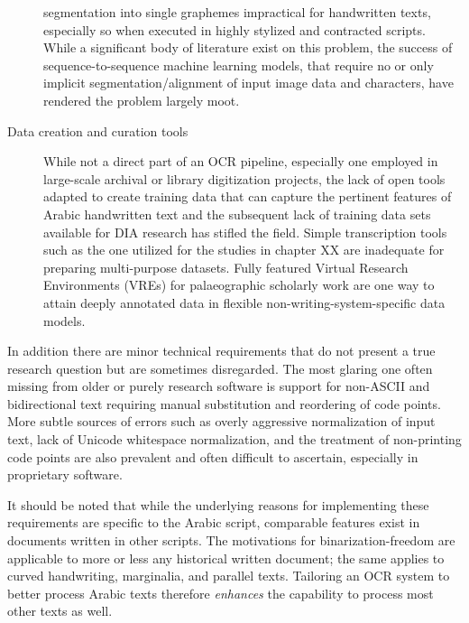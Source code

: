 \begin{description}
		segmentation into single graphemes impractical for handwritten
		texts, especially so when executed in highly stylized and
		contracted scripts. While a significant body of literature
		exist on this problem, the success of sequence-to-sequence
		machine learning models, that require no or only implicit
		segmentation/alignment of input image data and characters, have
		rendered the problem largely moot.
	\item[Data creation and curation tools] While not a direct part of an
		OCR pipeline, especially one employed in large-scale archival
		or library digitization projects, the lack of open tools
		adapted to create training data that can capture the pertinent
		features of Arabic handwritten text and the subsequent lack of
		training data sets available for DIA research has stifled the
		field. Simple transcription tools such as the one utilized for
		the studies in chapter XX are inadequate for preparing
		multi-purpose datasets. Fully featured Virtual Research
		Environments (VREs) for palaeographic scholarly work are one
		way to attain deeply annotated data in flexible
		non-writing-system-specific data models.
\end{description}

In addition there are minor technical requirements that do not present a true
research question but are sometimes disregarded. The most glaring one often
missing from older or purely research software is support for non-ASCII and
bidirectional text requiring manual substitution and reordering of code points.
More subtle sources of errors such as overly aggressive normalization of input
text, lack of Unicode whitespace normalization, and the treatment of
non-printing code points are also prevalent and often difficult to ascertain,
especially in proprietary software. 

It should be noted that while the underlying reasons for implementing these
requirements are specific to the Arabic script, comparable features exist in
documents written in other scripts. The motivations for binarization-freedom
are applicable to more or less any historical written document; the same
applies to curved handwriting, marginalia, and parallel texts. Tailoring an OCR
system to better process Arabic texts therefore \emph{enhances} the capability
to process most other texts as well.
